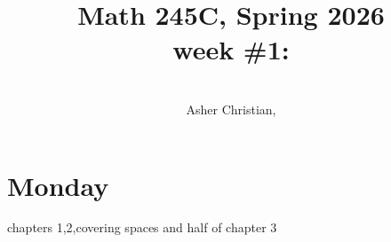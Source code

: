 \documentclass[11pt]{article}
\newcommand{\cnum}{Math 245C}
\newcommand{\ced}{Spring 2026}
\newcommand{\ctitle}[4]{\title{\vspace{-0.5in}\cnum, \ced\\week #1: #2}\author{\vspace{-0.35in}\\#3, #4}}
\begin{document}
\ctitle{\#1}{}{Asher Christian}{}
\date{}
\maketitle

\section{Monday}
chapters 1,2,covering spaces and half of chapter 3
\end{document}
